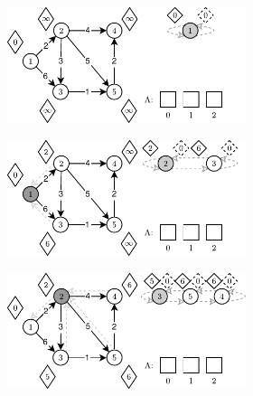 \begin{figure}[!htbp]
	\centering
	\begin{subfigure}[b]{\textwidth}
		\null\hfill
		\begin{subfigure}[b]{0.46\textwidth}
			\includegraphics[width=\textwidth]{Chapter_II/FIBONACCI-Example/a.pdf}
			\caption{}
			\label{fig:exampleFibonacci:a}
		\end{subfigure}
		\hfill
		\begin{subfigure}[b]{0.46\textwidth}
			\includegraphics[width=\textwidth]{Chapter_II/FIBONACCI-Example/b.pdf}
			\caption{}
			\label{fig:exampleFibonacci:b}
		\end{subfigure}
		\hfill\null
	\end{subfigure}
	\begin{subfigure}[b]{\textwidth}
		\null\hfill
		\begin{subfigure}[b]{0.46\textwidth}
			\includegraphics[width=\textwidth]{Chapter_II/FIBONACCI-Example/c.pdf}

\end{subfigure}
\end{subfigure}
\end{figure}
